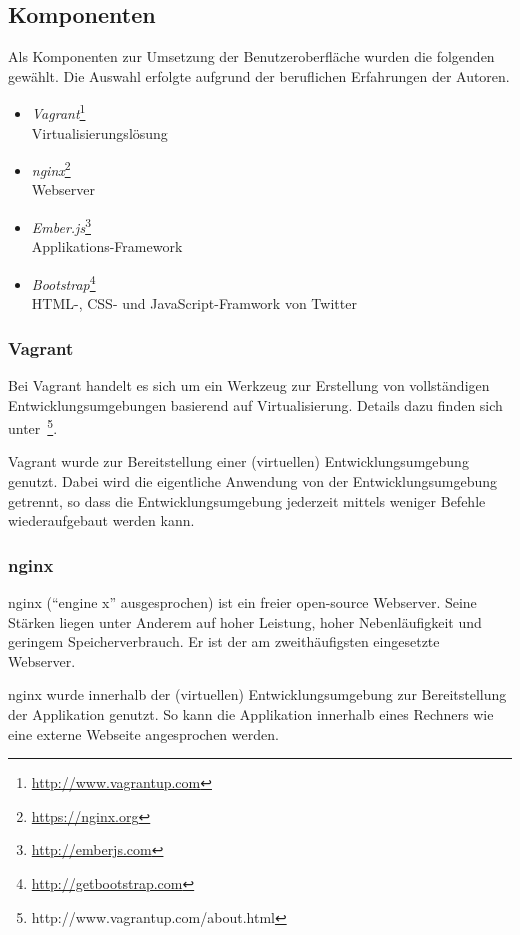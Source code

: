 \subsection{Komponenten}
\label{subsec:komponenten:gui:komponenten}
Als Komponenten zur Umsetzung der Benutzeroberfläche wurden die folgenden gewählt. Die Auswahl erfolgte aufgrund der beruflichen Erfahrungen der Autoren.
\begin{itemize}
    \item \textit{Vagrant}\footnote{\url{http://www.vagrantup.com}}\\
        Virtualisierungslösung
    \item \textit{nginx}\footnote{\url{https://nginx.org}}\\
        Webserver
    \item \textit{Ember.js}\footnote{\url{http://emberjs.com}}\\
        Applikations-Framework
    \item \textit{Bootstrap}\footnote{\url{http://getbootstrap.com}}\\
        HTML-, CSS- und JavaScript-Framwork von Twitter
\end{itemize}

\subsubsection{Vagrant}
\label{ssubsec:komponenten:gui:komponenten:vagrant}
Bei Vagrant handelt es sich um ein Werkzeug zur Erstellung von vollständigen Entwicklungsumgebungen basierend auf Virtualisierung. Details dazu finden sich unter~\footnote{http://www.vagrantup.com/about.html}.~\cite{vagrant}

Vagrant wurde zur Bereitstellung einer (virtuellen) Entwicklungsumgebung genutzt. Dabei wird die eigentliche Anwendung von der Entwicklungsumgebung getrennt, so dass die Entwicklungsumgebung jederzeit mittels weniger Befehle wiederaufgebaut werden kann.

\subsubsection{nginx}
\label{ssubsec:komponenten:gui:komponenten:nginx}
nginx (``engine x'' ausgesprochen) ist ein freier open-source Webserver. Seine Stärken liegen unter Anderem  auf hoher Leistung, hoher Nebenläufigkeit und geringem Speicherverbrauch. Er ist der am zweithäufigsten eingesetzte Webserver.~\cite{nginx}

nginx wurde innerhalb der (virtuellen) Entwicklungsumgebung zur Bereitstellung der Applikation genutzt. So kann die Applikation innerhalb eines Rechners wie eine externe Webseite angesprochen werden.

